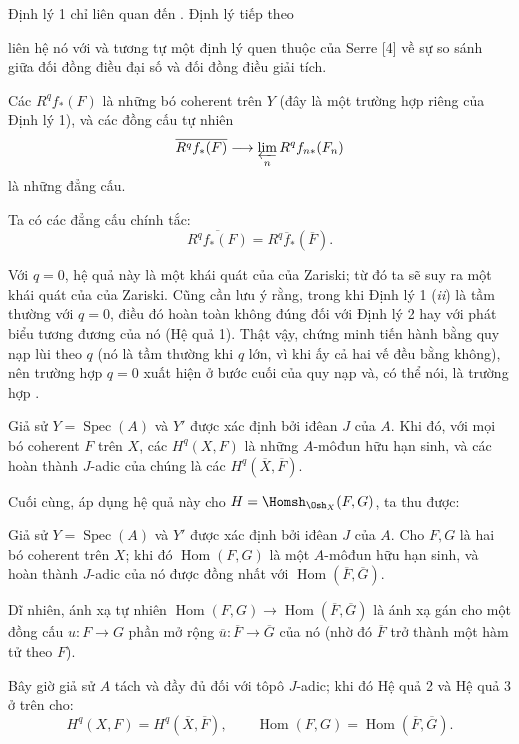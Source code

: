 Định lý 1 chỉ liên quan đến . Định lý tiếp theo

liên hệ nó với  và tương tự một định lý quen thuộc
của Serre [4] về sự so sánh giữa đối đồng điều đại số và đối đồng điều giải
tích.

 Các
$R^{q}f_{*}(F)$ là những bó coherent trên $Y$ (đây là một trường hợp riêng của
Định lý 1), và các đồng cấu tự nhiên
\[
  \overline{R^{q}f_{*}(F)}
  \longrightarrow \varprojlim_n R^{q}f_{n*}(F_n)
\]
là những đẳng cấu.

 Ta có các đẳng cấu chính tắc:
\[
  \overline{R^{q}f_{*}(F)}=R^{q}\overline f_{*}(\overline F).
\]

Với $q=0$, hệ quả này là một khái quát của  của Zariski; từ đó ta sẽ suy ra một khái quát của
 của Zariski. Cũng cần lưu ý rằng, trong khi Định
lý 1 (\textit{ii}) là tầm thường với $q=0$, điều đó hoàn toàn không đúng đối
với Định lý 2 hay với phát biểu tương đương của nó (Hệ quả 1). Thật vậy, chứng
minh tiến hành bằng quy nạp lùi theo $q$ (nó là tầm thường khi $q$ lớn, vì khi
ấy cả hai vế đều bằng không), nên trường hợp $q=0$ xuất hiện ở bước cuối của
quy nạp và, có thể nói, là trường hợp .

 Giả sử $Y=\operatorname{Spec}(A)$ và $Y'$ được xác định bởi
iđêan $J$ của $A$. Khi đó, với mọi bó coherent $F$ trên $X$, các
$H^{q}(X,F)$ là những $A$-môđun hữu hạn sinh, và các hoàn thành $J$-adic của
chúng là các $H^{q}(\overline X,\overline F)$.

Cuối cùng, áp dụng hệ quả này cho $H=\Homsh_{\Osh_X}(F,G)$, ta thu được:

 Giả sử $Y=\operatorname{Spec}(A)$ và $Y'$ được xác định bởi
iđêan $J$ của $A$. Cho $F,G$ là hai bó coherent trên $X$; khi đó
$\operatorname{Hom}(F,G)$ là một $A$-môđun hữu hạn sinh, và hoàn thành
$J$-adic của nó được đồng nhất với
$\operatorname{Hom}(\overline F,\overline G)$.

Dĩ nhiên, ánh xạ tự nhiên
$\operatorname{Hom}(F,G)\longrightarrow
\operatorname{Hom}(\overline F,\overline G)$ là ánh xạ gán cho một đồng cấu
$u:F\longrightarrow G$ phần mở rộng 
$\overline u:\overline F\longrightarrow\overline G$ của nó (nhờ đó
$\overline F$ trở thành một hàm tử theo $F$).

Bây giờ giả sử $A$ tách và đầy đủ đối với tôpô $J$-adic; khi đó Hệ quả 2 và
Hệ quả 3 ở trên cho:
\[
  H^{q}(X,F)=H^{q}(\overline X,\overline F),
  \qquad
  \operatorname{Hom}(F,G)
  =\operatorname{Hom}(\overline F,\overline G).
\]

